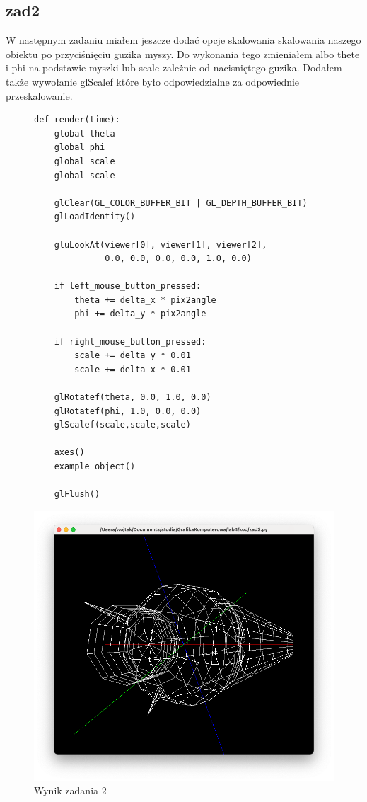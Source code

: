 \documentclass[]{article}
\begin{document}
\subsection{zad2}
W następnym zadaniu miałem jeszcze dodać opcje skalowania skalowania naszego obiektu po przyciśnięciu guzika myszy. Do wykonania tego zmieniałem albo thete i phi na podstawie myszki lub scale zależnie od nacisniętego guzika. Dodałem także wywołanie glScalef które było odpowiedzialne za odpowiednie przeskalowanie.
\begin{figure}[H]
	\begin{verbatim}
def render(time):
    global theta
    global phi
    global scale
    global scale

    glClear(GL_COLOR_BUFFER_BIT | GL_DEPTH_BUFFER_BIT)
    glLoadIdentity()

    gluLookAt(viewer[0], viewer[1], viewer[2],
              0.0, 0.0, 0.0, 0.0, 1.0, 0.0)

    if left_mouse_button_pressed:
        theta += delta_x * pix2angle
        phi += delta_y * pix2angle

    if right_mouse_button_pressed:
        scale += delta_y * 0.01
        scale += delta_x * 0.01

    glRotatef(theta, 0.0, 1.0, 0.0)
    glRotatef(phi, 1.0, 0.0, 0.0)
    glScalef(scale,scale,scale)

    axes()
    example_object()

    glFlush()
	\end{verbatim}
\end{figure}
\begin{figure}[H]

	\centering
	\includegraphics[width=\textwidth]{zad2.png}
	\caption{Wynik zadania 2}
\end{figure}
\end{document}
